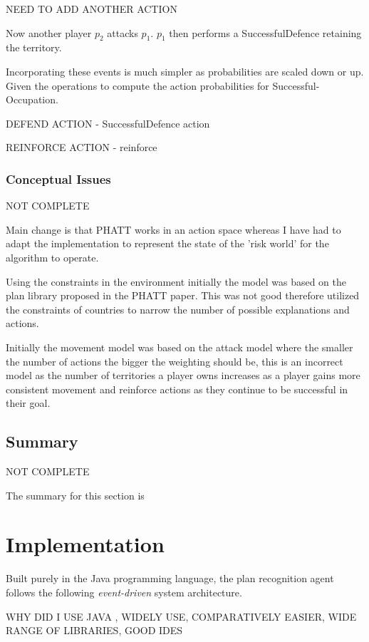 \documentclass[parskip]{cs4rep}
\begin{document}
NEED TO ADD ANOTHER ACTION

Now another player $p_2$ attacks $p_1$.  $p_1$ then performs a SuccessfulDefence retaining the territory.

Incorporating these events is much simpler as probabilities are scaled down or up. Given the operations to compute the action probabilities for Successful-Occupation.

DEFEND ACTION - SuccessfulDefence action

REINFORCE ACTION - reinforce

\subsection{Conceptual Issues}

NOT COMPLETE

Main change is that PHATT works in an action space whereas I have had to adapt the implementation to represent the state of the 'risk world' for the algorithm to operate.

Using the constraints in the environment initially the model was based on the plan library proposed in the PHATT paper. This was not good therefore utilized the constraints of countries to narrow the number of possible explanations and actions.

Initially the movement model was based on the attack model where the smaller the number of actions the bigger the weighting should be, this is an incorrect model as the number of territories a player owns increases as a player gains more consistent movement and reinforce actions as they continue to be successful in their goal.

\section{Summary}

NOT COMPLETE

The summary for this section is

\chapter{Implementation}

Built purely in the Java programming language, the plan recognition agent follows the following \textit{event-driven} system architecture.

WHY DID I USE JAVA , WIDELY USE, COMPARATIVELY EASIER, WIDE RANGE OF LIBRARIES, GOOD IDES
\end{document}

